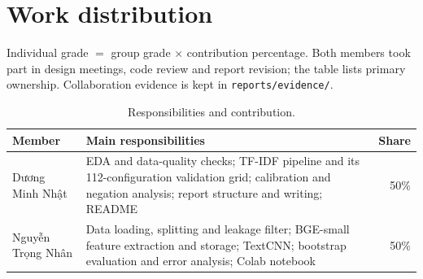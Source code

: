\section{Work distribution}
\label{sec:team}

Individual grade $=$ group grade $\times$ contribution percentage. Both members took part in design meetings, code review and report revision; the table lists primary ownership. Collaboration evidence is kept in \texttt{reports/evidence/}.

\begin{table}[H]
\centering
\small
\caption{Responsibilities and contribution.}
\label{tab:team}
\begin{tabular}{@{}P{3.4cm}P{9.4cm}r@{}}
\toprule
Member & Main responsibilities & Share \\
\midrule
Dương Minh Nhật & EDA and data-quality checks; TF-IDF pipeline and its 112-configuration validation grid; calibration and negation analysis; report structure and writing; README & 50\% \\
\midrule
Nguyễn Trọng Nhân & Data loading, splitting and leakage filter; BGE-small feature extraction and storage; TextCNN; bootstrap evaluation and error analysis; Colab notebook & 50\% \\
\bottomrule
\end{tabular}
\end{table}
